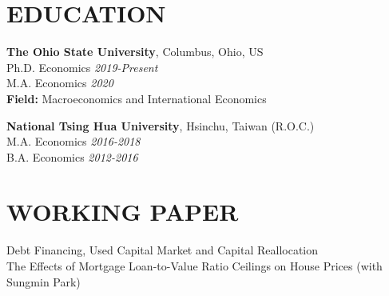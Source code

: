 \documentclass[10pt]{res} %
\begin{document}
\begin{resume}






\section{EDUCATION}

\vspace{8pt} %

{\bf The Ohio State University}, Columbus, Ohio, US \\
Ph.D. Economics \hfill  \textit{2019-Present} \\
M.A. Economics \hfill  \textit{2020} \\
\textbf{Field: } Macroeconomics and International Economics

{\bf National Tsing Hua University}, Hsinchu, Taiwan (R.O.C.) \\
M.A. Economics \hfill  \textit{2016-2018} \\
B.A. Economics \hfill  \textit{2012-2016} \\

\vspace{-10pt}

\section{WORKING PAPER}
\label{sec:research_experience}
Debt Financing, Used Capital Market and Capital Reallocation \\
The Effects of Mortgage Loan-to-Value Ratio Ceilings on House Prices (with Sungmin Park) \\


\end{resume}
\end{document}
